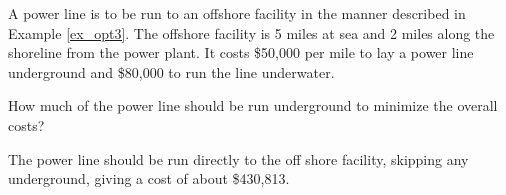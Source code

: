 {A power line is to be run to an offshore facility in the manner described in Example \ref{ex_opt3}. The offshore facility is 5 miles at sea and 2 miles along the shoreline from the power plant. It costs \$50,000 per mile to lay a power line underground and \$80,000 to run the line underwater. 

How much of the power line should be run underground to minimize the overall costs?
}
{The power line should be run directly to the off shore facility, skipping any underground, giving a cost of about \$430,813.
}

